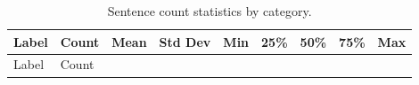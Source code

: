 \documentclass[
  titlepage]{article}
\begin{document}
\begin{longtable}[]{@{}
  >{\raggedright\arraybackslash}p{}
  >{\raggedright\arraybackslash}p{}
  >{\raggedright\arraybackslash}p{}
  >{\raggedright\arraybackslash}p{}
  >{\raggedright\arraybackslash}p{}
  >{\raggedright\arraybackslash}p{}
  >{\raggedright\arraybackslash}p{}
  >{\raggedright\arraybackslash}p{}
  >{\raggedright\arraybackslash}p{}@{}}
\caption{Sentence count statistics by category.}\tabularnewline
\toprule\noalign{}
\begin{minipage}[b]{\linewidth}\raggedright
Label
\end{minipage} & \begin{minipage}[b]{\linewidth}\raggedright
Count
\end{minipage} & \begin{minipage}[b]{\linewidth}\raggedright
Mean
\end{minipage} & \begin{minipage}[b]{\linewidth}\raggedright
Std Dev
\end{minipage} & \begin{minipage}[b]{\linewidth}\raggedright
Min
\end{minipage} & \begin{minipage}[b]{\linewidth}\raggedright
25\%
\end{minipage} & \begin{minipage}[b]{\linewidth}\raggedright
50\%
\end{minipage} & \begin{minipage}[b]{\linewidth}\raggedright
75\%
\end{minipage} & \begin{minipage}[b]{\linewidth}\raggedright
Max
\end{minipage} \\
\midrule\noalign{}
\endfirsthead
\toprule\noalign{}
\begin{minipage}[b]{\linewidth}\raggedright
Label
\end{minipage} & \begin{minipage}[b]{\linewidth}\raggedright
Count
\end{minipage} & \begin{minipage}[b]{\linewidth}\raggedright

\end{minipage}
\end{longtable}
\end{document}
